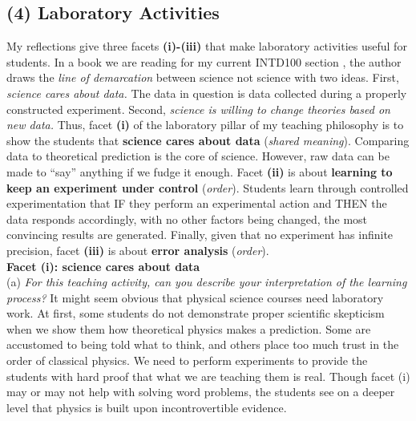 \documentclass[../../../main.tex]{subfiles}
\begin{document}
\subsection{(4) Laboratory Activities}

My reflections give three facets \textbf{(i)-(iii)} that make laboratory activities useful for students.  In a book we are reading for my current INTD100 section \cite{scientific_attitude}, the author draws the \textit{line of demarcation} between science not science with two ideas.  First, \textit{science cares about data.}  The data in question is data collected during a properly constructed experiment.  Second, \textit{science is willing to change theories based on new data.}  Thus, facet \textbf{(i)} of the laboratory pillar of my teaching philosophy is to show the students that \textbf{science cares about data} (\textit{shared meaning}).  Comparing data to theoretical prediction is the core of science.  However, raw data can be made to ``say'' anything if we fudge it enough.  Facet \textbf{(ii)} is about \textbf{learning to keep an experiment under control} (\textit{order}).  Students learn through controlled experimentation that IF they perform an experimental action and THEN the data responds accordingly, with no other factors being changed, the most convincing results are generated.  Finally, given that no experiment has infinite precision, facet \textbf{(iii)} is about \textbf{error analysis} (\textit{order}).
\\
\vspace{0.25cm}
\textbf{Facet (i): science cares about data}
\\
\vspace{0.25cm}
(a) \textit{For this teaching activity, can you describe your interpretation of the learning process?}  It might seem obvious that physical science courses need laboratory work.  At first, some students do not demonstrate proper scientific skepticism when we show them how theoretical physics makes a prediction.  Some are accustomed to being told what to think, and others place too much trust in the order of classical physics.  We need to perform experiments to provide the students with hard proof that what we are teaching them is real.  Though facet (i) may or may not help with solving word problems,  the students see on a deeper level that physics is built upon incontrovertible evidence.
\\
\vspace{0.25cm}
\end{document}
